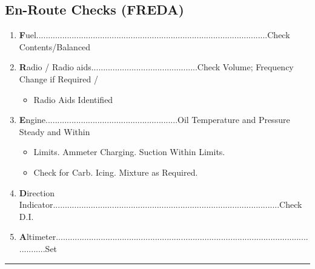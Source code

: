\documentclass[a4paper]{article}
\newenvironment{checklist}{
  \begin{itemize}[leftmargin=*, align=left]
    \setlength{\itemsep}{2pt}
    \setlength{\parskip}{0pt}
    \setlength{\parsep}{0pt}
}{
  \end{itemize}
}
\newenvironment{numberedchecklist}{
  \begin{enumerate}[label=\arabic*., leftmargin=*, align=left]
    \setlength{\itemsep}{2pt}
    \setlength{\parskip}{0pt}
    \setlength{\parsep}{0pt}
}{
  \end{enumerate}
}
\begin{document}
\subsection*{En-Route Checks (FREDA)}
\begin{numberedchecklist}
\item \textbf{F}uel..................................................................................................Check Contents/Balanced
\item \textbf{R}adio / Radio aids.............................................Check Volume; Frequency Change if Required /
  \begin{checklist}
  \item Radio Aids Identified
  \end{checklist}
\item \textbf{E}ngine........................................................Oil Temperature and Pressure Steady and Within
  \begin{checklist}
  \item Limits. Ammeter Charging. Suction Within Limits.
  \item Check for Carb. Icing. Mixture as Required.
  \end{checklist}
\item \textbf{D}irection Indicator................................................................................................Check D.I.
\item \textbf{A}ltimeter......................................................................................................................Set
\end{numberedchecklist}

\rule{\linewidth}{0.4pt}
\end{document}
